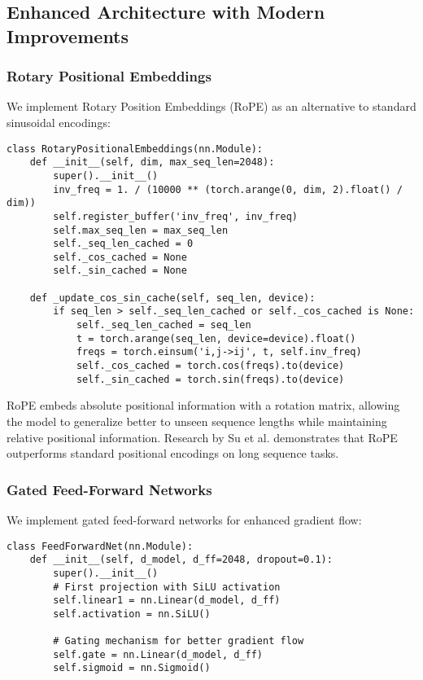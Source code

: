 \documentclass[12pt,a4paper]{article}
\begin{document}
\subsection{Enhanced Architecture with Modern Improvements}

\subsubsection{Rotary Positional Embeddings}

We implement Rotary Position Embeddings (RoPE) \cite{su2021roformer} as an alternative to standard sinusoidal encodings:

\begin{verbatim}
class RotaryPositionalEmbeddings(nn.Module):
    def __init__(self, dim, max_seq_len=2048):
        super().__init__()
        inv_freq = 1. / (10000 ** (torch.arange(0, dim, 2).float() / dim))
        self.register_buffer('inv_freq', inv_freq)
        self.max_seq_len = max_seq_len
        self._seq_len_cached = 0
        self._cos_cached = None
        self._sin_cached = None

    def _update_cos_sin_cache(self, seq_len, device):
        if seq_len > self._seq_len_cached or self._cos_cached is None:
            self._seq_len_cached = seq_len
            t = torch.arange(seq_len, device=device).float()
            freqs = torch.einsum('i,j->ij', t, self.inv_freq)
            self._cos_cached = torch.cos(freqs).to(device)
            self._sin_cached = torch.sin(freqs).to(device)
\end{verbatim}

RoPE embeds absolute positional information with a rotation matrix, allowing the model to generalize better to unseen sequence lengths while maintaining relative positional information. Research by Su et al. \cite{su2021roformer} demonstrates that RoPE outperforms standard positional encodings on long sequence tasks.

\subsubsection{Gated Feed-Forward Networks}

We implement gated feed-forward networks for enhanced gradient flow:

\begin{verbatim}
class FeedForwardNet(nn.Module):
    def __init__(self, d_model, d_ff=2048, dropout=0.1):
        super().__init__()
        # First projection with SiLU activation
        self.linear1 = nn.Linear(d_model, d_ff)
        self.activation = nn.SiLU()
        
        # Gating mechanism for better gradient flow
        self.gate = nn.Linear(d_model, d_ff)
        self.sigmoid = nn.Sigmoid()
\end{verbatim}
\end{document}
